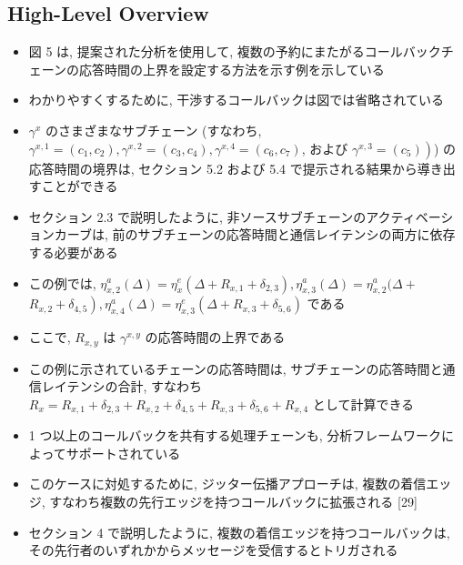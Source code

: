 \subsection{High-Level Overview}
\label{ssec: high-level overview}

\begin{frame}{}
    \begin{itemize}
        \item 図 5 は, 提案された分析を使用して, 複数の予約にまたがるコールバックチェーンの応答時間の上界を設定する方法を示す例を示している
\item わかりやすくするために, 干渉するコールバックは図では省略されている
\item $\gamma^{x}$ のさまざまなサブチェーン (すなわち, $\gamma^{x, 1}=\left(c_{1}, c_{2}\right), \gamma^{x, 2}=\left(c_{3}, c_{4}\right), \gamma^{x, 4}=\left(c_{6}, c_{7}\right)$, および $\left.\gamma^{x, 3}=\left(c_{5}\right)\right)$) の応答時間の境界は, セクション 5.2 および 5.4 で提示される結果から導き出すことができる
    \end{itemize}
\end{frame}

\begin{frame}{}
    \begin{itemize}
        \item セクション 2.3 で説明したように, 非ソースサブチェーンのアクティベーションカーブは, 前のサブチェーンの応答時間と通信レイテンシの両方に依存する必要がある
\item この例では, $\eta_{x, 2}^{a}(\Delta)=\eta_{x}^{e}\left(\Delta+R_{x, 1}+\delta_{2,3}\right), \eta_{x, 3}^{a}(\Delta)=\eta_{x, 2}^{a}(\Delta+$  $\left.R_{x, 2}+\delta_{4,5}\right), \eta_{x, 4}^{a}(\Delta)=\eta_{x, 3}^{e}\left(\Delta+R_{x, 3}+\delta_{5,6}\right)$ である
\item ここで, $R_{x, y}$ は $\gamma^{x, y}$ の応答時間の上界である
\item この例に示されているチェーンの応答時間は, サブチェーンの応答時間と通信レイテンシの合計, すなわち $R_{x}=R_{x, 1}+\delta_{2,3}+R_{x, 2}+\delta_{4,5}+R_{x, 3}+\delta_{5,6}+R_{x, 4}$ として計算できる
    \end{itemize}
\end{frame}

\begin{frame}{}
    \begin{itemize}
        \item 1 つ以上のコールバックを共有する処理チェーンも, 分析フレームワークによってサポートされている
\item このケースに対処するために, ジッター伝播アプローチは, 複数の着信エッジ, すなわち複数の先行エッジを持つコールバックに拡張される [29]
\item セクション 4 で説明したように, 複数の着信エッジを持つコールバックは, その先行者のいずれかからメッセージを受信するとトリガされる
    \end{itemize}
\end{frame}

